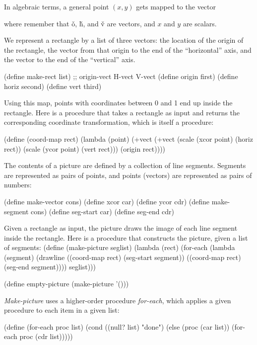 In algebraic terms, a general point $(x,y)$
gets mapped to the vector


where remember that \v{o}, \v{h}, and \v{v} are vectors, and $x$ and $y$
are scalars.

\vpar
We represent a rectangle by a list of three vectors: the location of the
origin of the rectangle, the vector from that origin to the end of the
``horizontal'' axis, and the vector to the end of the ``vertical'' axis.

\beginlisp
(define make-rect list)             ;; origin-vect H-vect V-vect
(define origin first)
(define horiz second)
(define vert third)
\endlisp
	
Using this map, points with coordinates between 0 and 1 end up inside
the rectangle.  Here is a procedure that takes a rectangle as input
and returns the corresponding coordinate transformation, which is itself
a procedure: 

\beginlisp
(define (coord-map rect)
  (lambda (point)
    (+vect
     (+vect (scale (xcor point)
                   (horiz rect))
            (scale (ycor point)
                   (vert rect)))
     (origin rect))))

\endlisp

The contents of a picture are defined by a
collection of line segments.
Segments are
represented as pairs of points, and
points (vectors) are represented as pairs of numbers:

\beginlisp
(define make-vector cons)
(define xcor car)
(define ycor cdr)
\pbrk
(define make-segment cons)
(define seg-start car)
(define seg-end cdr)
\endlisp


Given a rectangle as input, the picture
draws the image of each line segment inside the rectangle.  Here is a
procedure that constructs the picture, given a list of segments:
\beginlisp
(define (make-picture seglist)
  (lambda (rect)
    (for-each
     (lambda (segment)
       (drawline ((coord-map rect) (seg-start segment))
                 ((coord-map rect) (seg-end segment))))
     seglist)))

\pbrk
(define empty-picture (make-picture '()))
\endlisp

{\it Make-picture} uses a higher-order procedure {\it for-each}, which applies
a given procedure to each item in a given list:

\beginlisp
(define (for-each proc list)
  (cond ((null? list) "done")
        (else (proc (car list))
              (for-each proc (cdr list)))))
\endlisp

